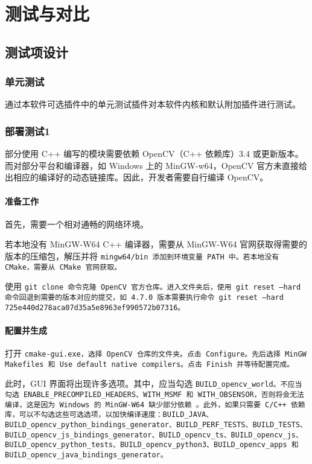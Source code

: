 \chapter{测试与对比}

\section{测试项设计}

\subsection{单元测试}

通过本软件可选插件中的单元测试插件对本软件内核和默认附加插件进行测试。

\subsection{部署测试1}

部分使用 C++ 编写的模块需要依赖 OpenCV（C++ 依赖库）3.4 或更新版本。而对部分平台和编译器，如 Windows 上的 MinGW-w64，OpenCV 官方未直接给出相应的编译好的动态链接库。因此，开发者需要自行编译 OpenCV。

\subsubsection{准备工作}

首先，需要一个相对通畅的网络环境。

若本地没有 MinGW-W64 C++ 编译器，需要从 MinGW-W64 官网获取得需要的版本的压缩包，解压并将 \tt{mingw64/bin} 添加到环境变量 \tt{PATH} 中。若本地没有 CMake，需要从 CMake 官网获取。

使用 \tt{git clone} 命令克隆 OpenCV 官方仓库。进入文件夹后，使用 \tt{git reset --hard} 命令回退到需要的版本对应的提交，如 4.7.0 版本需要执行命令 \tt{git reset --hard 725e440d278aca07d35a5e8963ef990572b07316}。

\subsubsection{配置并生成}

打开 \tt{cmake-gui.exe}，选择 OpenCV 仓库的文件夹。点击 \tt{Configure}。先后选择 \tt{MinGW Makefiles} 和 \tt{Use default native compilers}。点击 \tt{Finish} 并等待配置完成。

此时，GUI 界面将出现许多选项。其中，应当勾选 \tt{BUILD\_opencv\_world}。不应当勾选 \tt{ENABLE\_PRECOMPILED\_HEADERS}、\tt{WITH\_MSMF} 和 \tt{WITH\_OBSENSOR}，否则将会无法编译，这是因为 Windows 的 MinGW-W64 缺少部分依赖 \cite{opencv_cmake}。此外，如果只需要 C/C++ 依赖库，可以不勾选这些可选选项，以加快编译速度：\tt{BUILD\_JAVA}、\tt{BUILD\_opencv\_python\_bindings\_generator}、\tt{BUILD\_PERF\_TESTS}、\tt{BUILD\_TESTS}、\\\tt{BUILD\_opencv\_js\_bindings\_generator}、\tt{BUILD\_opencv\_ts}、\tt{BUILD\_opencv\_js}、\\\tt{BUILD\_opencv\_python\_tests}、\tt{BUILD\_opencv\_python3}、\tt{BUILD\_opencv\_apps} 和 \\\tt{BUILD\_opencv\_java\_bindings\_generator}。

